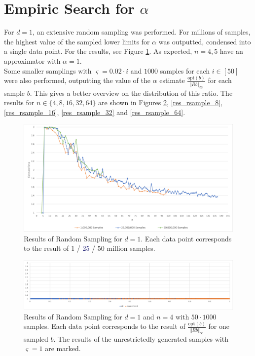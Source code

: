 \section{Empiric Search for $\alpha$}
For $d=1$, an extensive random sampling was performed. For millions of samples, the highest value of the sampled lower limits for $\alpha$ was outputted, condensed into a single data point. For the results, see Figure \ref{res_rsample}. As expected, $n=4,5$ have an approximator with $\alpha=1$.\\
Some smaller samplings with $\varsigma=0.02\cdot i$ and $1000$ samples for each $i\in[50]$ were also performed, outputting the value of the $\alpha$ estimate $\frac{\text{opt}(b)}{\Vert Rb\Vert_\infty}$ for each sample $b$. This gives a better overview on the distribution of this ratio. The results for $n\in\{4,8,16,32,64\}$ are shown in Figures \ref{res_rsample_4}, \ref{res_rsample_8}, \ref{res_rsample_16}, \ref{res_rsample_32} and \ref{res_rsample_64}.
\begin{figure}
\begin{center}
\includegraphics[scale=.55]{scatter-alpha-n-labelled.png}
\end{center}
\caption{Results of Random Sampling for $d=1$. Each data point corresponds to the result of \textcolor{RedOrange}{1} / \textcolor{MidnightBlue}{25} / \textcolor{OliveGreen}{50} million samples.}\label{res_rsample}
\end{figure}
\begin{figure}
\begin{center}
\includegraphics[scale=.48]{scatter-alpha-4-50-1000.png}
\end{center}
\caption{Results of Random Sampling for $d=1$ and $n=4$ with $50\cdot 1000$ samples. Each data point corresponds to the result of $\frac{\text{opt}(b)}{\Vert Rb\Vert_\infty}$ for one sampled $b$. The results of the unrestrictedly generated samples with $\varsigma=1$ are marked.}\label{res_rsample_4}
\end{figure}
